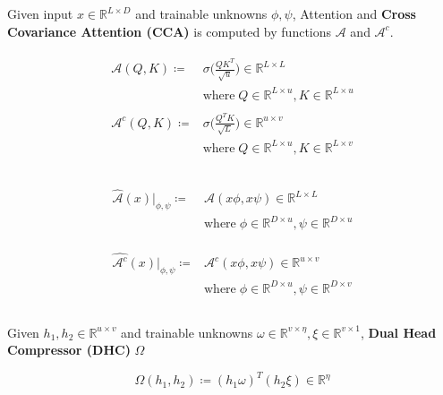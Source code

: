 \documentclass{article}
\begin{document}
\begin{tcolorbox}
Given input $x \in \mathbb{R}^{L \times D}$ and trainable unknowns $\phi, \psi$, Attention and \textbf{Cross Covariance Attention (CCA)} is computed by functions $\mathcal{A}$ and $\mathcal{A}^{c}$.
	
\begin{minipage}{0.48\textwidth}
	\begin{eqnarray*}
		\begin{aligned}
		\mathcal{A}(Q,K) \coloneqq&  \sigma\Bigg(\frac{Q K^{T}}{\sqrt{u}}\Bigg) \in \mathbb{R}^{L \times L} \\
		& \text{where} \;  Q \in \mathbb{R}^{L \times u}, K \in \mathbb{R}^{L \times u}  \\
		\\
		\mathcal{A}^{c}(Q,K) \coloneqq& \sigma\Bigg(\frac{Q^T K}{\sqrt{L}}\Bigg) \in \mathbb{R}^{u \times v} \\
		& \text{where} \;  Q \in \mathbb{R}^{L \times u}, K \in \mathbb{R}^{L \times v} \\
		\\
		\end{aligned}
	\end{eqnarray*}
\end{minipage}%
\begin{minipage}{0.48\textwidth}
	\begin{eqnarray*}
		\begin{aligned}
		\widehat{\mathcal{A}}(x)\vert_{\phi, \psi} \coloneqq& \mathcal{A}(x\phi, x\psi) \in \mathbb{R}^{L \times L} \\
		& \text{where} \; \phi \in \mathbb{R}^{D\times u}, \psi \in \mathbb{R}^{D \times u} \\
		\\
		\\
		\\
		\widehat{\mathcal{A}^{c}}(x)\vert_{\phi, \psi} \coloneqq& \mathcal{A}^{c}(x\phi, x\psi) \in \mathbb{R}^{u \times v} \\
		& \text{where} \; \phi \in \mathbb{R}^{D\times u}, \psi \in \mathbb{R}^{D \times v} \\
		\\
		\end{aligned}
	\end{eqnarray*}
\end{minipage}
\end{tcolorbox}

\begin{tcolorbox}
	Given $h_{1}, h_{2} \in \mathbb{R}^{u\times v}$ and trainable unknowns $\omega \in \mathbb{R}^{v\times \eta}, \xi \in \mathbb{R}^{v\times 1}$, \textbf{Dual Head Compressor (DHC)} $\Omega$
	
	\begin{equation*}
		\Omega(h_{1}, h_{2}) \coloneqq (h_{1} \omega)^{T} (h_{2}\xi) \in \mathbb{R}^{\eta}
	\end{equation*}
\end{tcolorbox}
\end{document}
